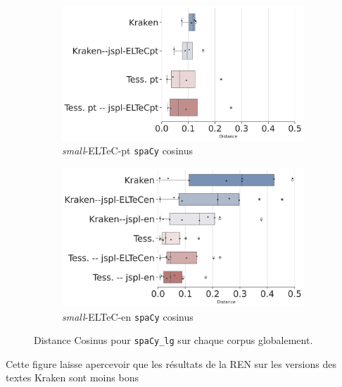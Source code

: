 \begin{figure}[h!]
    \begin{subfigure}{0.45\textwidth}
  \includegraphics[height=.57\textwidth]{REVUETAL_article_23102023/IMAGES/Boite-a_moustache_12072024/ELTeC_Por_spaCy3.5.1/ELTeC_Por_spaCy3.5.1-lg-cosinus-sim2-3.png} 
        \caption{\textit{small}-ELTeC-pt \texttt{spaCy} cosinus} 
         \label{fig:ELTeC-Por-spaCy-cosinus}
   \end{subfigure}
    \begin{subfigure}{0.45\textwidth}
  \includegraphics[height=.58\textwidth]{REVUETAL_article_23102023/IMAGES/Boite-a_moustache_12072024/ELTeC_eng_spaCy3.5.1/ELTeC_eng_spaCy3.5.1-lg-cosinus-sim2-3.png}
        \caption{\textit{small}-ELTeC-en \texttt{spaCy} cosinus}
        \label{fig:Cosinus-spaCy-lg-ELTeC-eng}
   \end{subfigure}

    \caption{Distance Cosinus pour \texttt{spaCy\_lg} sur chaque corpus globalement.}
\label{fig:Cosinus-spacy-lg}
\end{figure}
Cette figure laisse apercevoir que les résultats de la REN sur les versions des textes Kraken sont moins bons 
